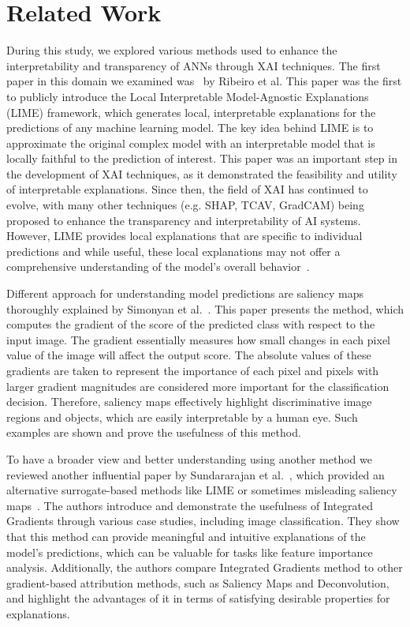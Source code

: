 \documentclass[journal, a4paper]{IEEEtran}
\begin{document}
\section{Related Work}\label{sec:related-work}
During this study, we explored various methods used to enhance the interpretability and transparency of ANNs through XAI techniques.
The first paper in this domain we examined was~\cite{ribeiro2016should} by Ribeiro et al.
This paper was the first to publicly introduce the Local Interpretable Model-Agnostic Explanations (LIME) framework, which generates local, interpretable explanations for the predictions of any machine learning model.
The key idea behind LIME is to approximate the original complex model with an interpretable model that is locally faithful to the prediction of interest.
This paper was an important step in the development of XAI techniques, as it demonstrated the feasibility and utility of interpretable explanations.
Since then, the field of XAI has continued to evolve, with many other techniques (e.g. SHAP, TCAV, GradCAM) being proposed to enhance the transparency and interpretability of AI systems.
However, LIME provides local explanations that are specific to individual predictions and while useful, these local explanations may not offer a comprehensive understanding of the model's overall behavior~\cite{NIPS2017_8a20a862}.

Different approach for understanding model predictions are saliency maps thoroughly explained by Simonyan et al.~\cite{Simonyan14a}.
This paper presents the method, which computes the gradient of the score of the predicted class with respect to the input image.
The gradient essentially measures how small changes in each pixel value of the image will affect the output score.
The absolute values of these gradients are taken to represent the importance of each pixel and pixels with larger gradient magnitudes are considered more important for the classification decision.
Therefore, saliency maps effectively highlight discriminative image regions and objects, which are easily interpretable by a human eye.
Such examples are shown and prove the usefulness of this method.

To have a broader view and better understanding using another method we reviewed another influential paper by Sundararajan et al.~\cite{ribeiro2016should}, which provided an alternative surrogate-based methods like LIME or sometimes misleading saliency maps~\cite{adebayo2018sanity}.
The authors introduce and demonstrate the usefulness of Integrated Gradients through various case studies, including image classification.
They show that this method can provide meaningful and intuitive explanations of the model's predictions, which can be valuable for tasks like feature importance analysis.
Additionally, the authors compare Integrated Gradients method to other gradient-based attribution methods, such as Saliency Maps and Deconvolution, and highlight the advantages of it in terms of satisfying desirable properties for explanations.
\end{document}
